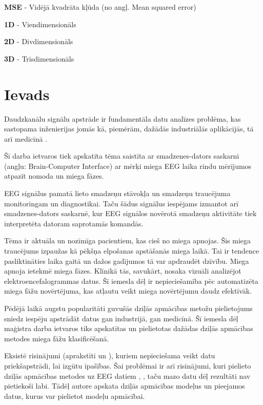 \documentclass[12pt,paper=A4]{report}
\begin{document}
\textbf{MSE} - Vidējā kvadrāta kļūda (no angļ. Mean squared error)

\textbf{1D} - Viendimensionāls

\textbf{2D} - Divdimensionāls

\textbf{3D} - Trīsdimensionāls  

\chapter*{Ievads}

\sloppy
{}
Daudzkanālu signālu apstrāde ir fundamentāla datu analīzes problēma, kas sastopama inženierijas jomās kā, piemērām, dažādās industriālās aplikācijās, tā arī medicīnā \cite{li2011sensor}. 

Šī darba ietvaros tiek apskatīta tēma saistīta ar smadzenes-dators saskarni (angļu: Brain-Computer Interface) ar mērķi miega EEG laika rindu mērījumos atpazīt nomoda un miega fāzes.

EEG signālus pamatā lieto smadzeņu stāvokļa un smadzeņu traucējuma monitoringam un diagnostikai. Taču šādus signālus iespējams izmantot arī smadzenes-dators saskarnē, kur EEG signālos novērotā smadzeņu aktivitāte tiek interpretēta datoram saprotamās komandās.

Tēma ir aktuāla un nozīmīga pacientiem, kas cieš no miega apnojas. Šis miega traucējums izpaužas kā pēkšņa elpošanas apstāšanās miega laikā. Tai ir tendence pasliktināties laika gaitā un dažos gadījumos tā var apdraudēt dzīvību. 
Miega apnoja ietekmē miega fāzes. Klīnikā tās, savukārt, nosaka vizuāli analizējot elektroencefalogrammas datus. Šī iemesla dēļ ir nepieciešamība pēc automatizēta miega fāžu novērtējuma, kas atļautu veikt miega novērtējumu daudz efektīvāk. 

Pēdējā laikā augstu popularitāti guvušās dziļās apmācības metožu pielietojums sniedz iespēju apstrādāt datus gan industrijā, gan medicīnā. Šī iemesla dēļ maģistra darba ietvaros tiks apskatītas un pielietotas dažādas dziļās apmācības metodes miega fāžu klasificēšanā. 

Eksistē risinājumi (aprakstīti \cite{rahman2018sleep} un \cite{shi2015multi}), kuriem nepieciešama veikt datu priekšapstrādi, lai izgūtu īpašības. Šai problēmai ir arī risinājumi, kuri pielieto dziļās apmācības metodes uz EEG datiem \cite{git1}, \cite{git2}, taču mazo datu dēļ rezultāti nav pietiekoši labi. Tādēļ autore apskata dziļās apmācības modeļus un pieejamos datus, kurus var pielietot modeļu apmācībai.
\end{document}
